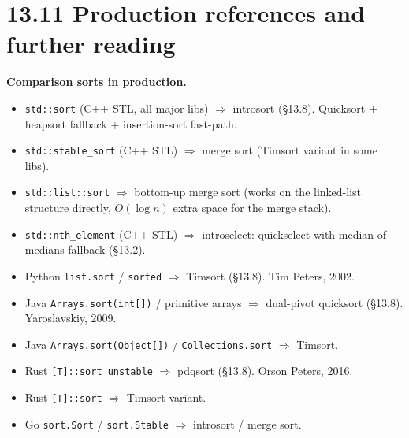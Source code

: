 \documentclass[11pt]{article}
\begin{document}
\section{13.11 Production references and further reading}

\begin{notebox}
\textbf{Comparison sorts in production.}
\begin{itemize}[leftmargin=*]
    \item \texttt{std::sort} (C++ STL, all major libs) $\Rightarrow$
          introsort (\S13.8). Quicksort + heapsort fallback +
          insertion-sort fast-path.
    \item \texttt{std::stable\_sort} (C++ STL) $\Rightarrow$ merge
          sort (Timsort variant in some libs).
    \item \texttt{std::list::sort} $\Rightarrow$ bottom-up merge
          sort (works on the linked-list structure directly,
          $O(\log n)$ extra space for the merge stack).
    \item \texttt{std::nth\_element} (C++ STL) $\Rightarrow$
          introselect: quickselect with median-of-medians
          fallback (\S13.2).
    \item Python \texttt{list.sort} / \texttt{sorted}
          $\Rightarrow$ Timsort (\S13.8). Tim Peters, 2002.
    \item Java \texttt{Arrays.sort(int[])} / primitive arrays
          $\Rightarrow$ dual-pivot quicksort (\S13.8). Yaroslavskiy,
          2009.
    \item Java \texttt{Arrays.sort(Object[])} / \texttt{Collections.sort}
          $\Rightarrow$ Timsort.
    \item Rust \texttt{[T]::sort\_unstable} $\Rightarrow$ pdqsort
          (\S13.8). Orson Peters, 2016.
    \item Rust \texttt{[T]::sort} $\Rightarrow$ Timsort variant.
    \item Go \texttt{sort.Sort} / \texttt{sort.Stable}
          $\Rightarrow$ introsort / merge sort.
\end{itemize}


\end{notebox}
\end{document}
